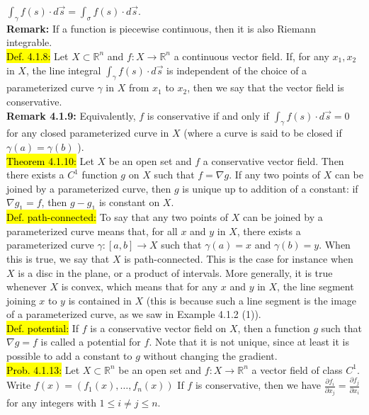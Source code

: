 \documentclass[10pt,landscape]{article}
\newcommand{\green}[1]{\sethlcolor{green}\hl{#1}}
\newcommand{\yellow}[1]{\sethlcolor{yellow} \hl{#1}}
\newcommand{\blue}[1]{\sethlcolor{cyan} \hl{#1}}
\begin{document}
\begin{multicols}{3}
$\int_{\gamma} f(s) \cdot d \vec{s}=\int_{\sigma} f(s) \cdot d \vec{s}$.\\
\textbf{Remark:} If a function is piecewise continuous, then it is also Riemann integrable.\\
\blue{Def. 4.1.8:} Let $X \subset \mathbb{R}^{n}$ and $f: X \rightarrow \mathbb{R}^{n}$ a continuous vector field. If, for any $x_{1}, x_{2}$ in $X$, the line integral
$\int_{\gamma} f(s) \cdot d \vec{s}$
is independent of the choice of a parameterized curve $\gamma$ in $X$ from $x_{1}$ to $x_{2}$, then we say that the vector field is conservative.\\
\textbf{Remark 4.1.9:} Equivalently, $f$ is conservative if and only if $\int_{\gamma} f(s) \cdot d \vec{s}=0$
for any closed parameterized curve in $X$ (where a curve is said to be closed if $\gamma(a)=\gamma(b)$ ).\\
\green{Theorem 4.1.10:} Let $X$ be an open set and $f$ a conservative vector field. Then there exists a $C^{1}$ function $g$ on $X$ such that $f=\nabla g$.
If any two points of $X$ can be joined by a parameterized curve, then $g$ is unique up to addition of a constant: if $\nabla g_{1}=f$, then $g-g_{1}$ is constant on $X$.\\
\blue{Def. path-connected: } To say that any two points of $X$ can be joined by a parameterized curve means that, for all $x$ and $y$ in $X$, there exists a parameterized curve $\gamma:[a, b] \rightarrow X$ such that $\gamma(a)=x$ and $\gamma(b)=y$. When this is true, we say that $X$ is path-connected.
This is the case for instance when $X$ is a disc in the plane, or a product of intervals. More generally, it is true whenever $X$ is convex, 
which means that for any $x$ and $y$ in $X$, the line segment joining $x$ to $y$ is contained in $X$ (this is because such a line segment is the image of a parameterized curve, as we saw in Example 4.1.2 (1)).\\
\blue{Def. potential: } If $f$ is a conservative vector field on $X$, then a function $g$ such that $\nabla g=f$ is called a potential for $f$. Note that it is not unique, since at least it is possible to add a constant to $g$ without changing the gradient.\\
\yellow{Prob. 4.1.13:} Let $X \subset \mathbb{R}^{n}$ be an open set and $f: X \rightarrow \mathbb{R}^{n}$ a vector field of class $C^{1}$. Write
$f(x)=\left(f_{1}(x), \ldots, f_{n}(x)\right)$
If $f$ is conservative, then we have $\frac{\partial f_{i}}{\partial x_{j}}=\frac{\partial f_{j}}{\partial x_{i}}$
for any integers with $1 \leqslant i \neq j \leqslant n$.\\

\end{multicols}
\end{document}

